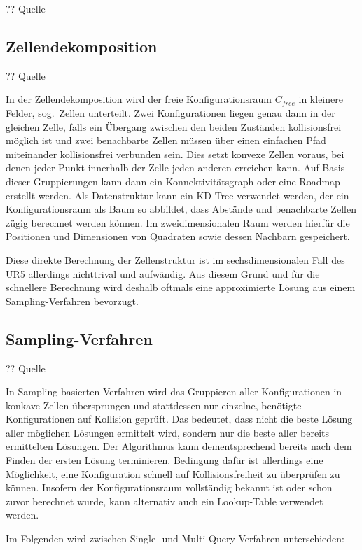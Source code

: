 ?? Quelle

\subsection{Zellendekomposition}\label{subsec:zellendekomposition}
?? Quelle

In der Zellendekomposition wird der freie Konfigurationsraum $C_{free}$ in kleinere Felder, sog.\ Zellen unterteilt.
Zwei Konfigurationen liegen genau dann in der gleichen Zelle, falls ein Übergang zwischen den beiden Zuständen kollisionsfrei möglich ist und zwei benachbarte Zellen müssen über einen einfachen Pfad miteinander kollisionsfrei verbunden sein.
Dies setzt konvexe Zellen voraus, bei denen jeder Punkt innerhalb der Zelle jeden anderen erreichen kann.
Auf Basis dieser Gruppierungen kann dann ein Konnektivitätsgraph oder eine Roadmap erstellt werden.
Als Datenstruktur kann ein KD-Tree verwendet werden, der ein Konfigurationsraum als Baum so abbildet, dass Abstände und benachbarte Zellen zügig berechnet werden können.
Im zweidimensionalen Raum werden hierfür die Positionen und Dimensionen von Quadraten sowie dessen Nachbarn gespeichert.

Diese direkte Berechnung der Zellenstruktur ist im sechsdimensionalen Fall des UR5 allerdings nichttrival und aufwändig.
Aus diesem Grund und für die schnellere Berechnung wird deshalb oftmals eine approximierte Lösung aus einem Sampling-Verfahren bevorzugt.

\subsection{Sampling-Verfahren}
?? Quelle

In Sampling-basierten Verfahren wird das Gruppieren aller Konfigurationen in konkave Zellen übersprungen und stattdessen nur einzelne, benötigte Konfigurationen auf Kollision geprüft.
Das bedeutet, dass nicht die beste Lösung aller möglichen Lösungen ermittelt wird, sondern nur die beste aller bereits ermittelten Lösungen.
Der Algorithmus kann dementsprechend bereits nach dem Finden der ersten Lösung terminieren.
Bedingung dafür ist allerdings eine Möglichkeit, eine Konfiguration schnell auf Kollisionsfreiheit zu überprüfen zu können.
Insofern der Konfigurationsraum vollständig bekannt ist oder schon zuvor berechnet wurde, kann alternativ auch ein Lookup-Table verwendet werden.

Im Folgenden wird zwischen Single- und Multi-Query-Verfahren unterschieden:

